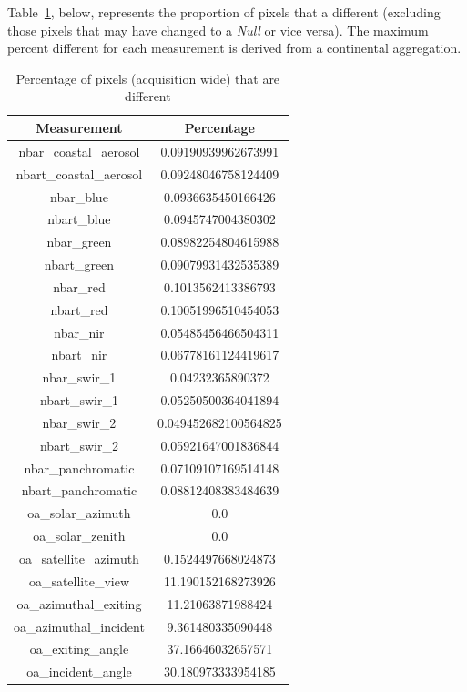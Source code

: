 \documentclass[a4paper]{article}
\begin{document}
    \begin{flushleft}
      Table~\ref{table:4}, below, represents the proportion of pixels that a different (excluding those pixels that may have changed to a \textit{Null} or vice versa). The maximum percent different for each measurement is derived from a continental aggregation.
    \end{flushleft}

    \begin{table}[ht!]
      \caption{Percentage of pixels (acquisition wide) that are different}\label{table:4}
      \centering
      \begin{tabular}{cc} \midrule
        \textbf{Measurement} & \textbf{Percentage} \\ \midrule
        nbar\_coastal\_aerosol & 0.09190939962673991 \\
        nbart\_coastal\_aerosol & 0.09248046758124409 \\
        nbar\_blue & 0.0936635450166426 \\
        nbart\_blue & 0.0945747004380302 \\
        nbar\_green & 0.08982254804615988 \\
        nbart\_green & 0.09079931432535389 \\
        nbar\_red & 0.1013562413386793 \\
        nbart\_red & 0.10051996510454053 \\
        nbar\_nir & 0.05485456466504311 \\
        nbart\_nir & 0.06778161124419617 \\
        nbar\_swir\_1 & 0.04232365890372 \\
        nbart\_swir\_1 & 0.05250500364041894 \\
        nbar\_swir\_2 & 0.049452682100564825 \\
        nbart\_swir\_2 & 0.05921647001836844 \\
        nbar\_panchromatic & 0.07109107169514148 \\
        nbart\_panchromatic & 0.08812408383484639 \\
        oa\_solar\_azimuth & 0.0 \\
        oa\_solar\_zenith & 0.0 \\
        oa\_satellite\_azimuth & 0.1524497668024873 \\
        oa\_satellite\_view & 11.190152168273926 \\
        oa\_azimuthal\_exiting & 11.21063871988424 \\
        oa\_azimuthal\_incident & 9.361480335090448 \\
        oa\_exiting\_angle & 37.16646032657571 \\
        oa\_incident\_angle & 30.180973333954185 \\ \midrule
      \end{tabular}
    \end{table}
\end{document}
